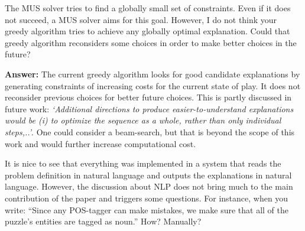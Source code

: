 \documentclass{article}
\newcommand\comment[1]{\marginpar{\tiny #1}}
\renewcommand\comment[1]{#1}
\newcommand{\tias}[1]{{\comment{\color{blue}\textsc{TG:}#1}}}
\newcommand{\emilio}[1]{{\comment{\color{red} \textsc{EG:}#1}}}
\newcommand{\answer}[1]{{\comment{\textbf{Answer:} #1}}}
\begin{document}

\begin{quoteit}
The MUS solver tries to find a globally small set of constraints. Even if it does not succeed, a MUS solver aims for this goal. However, I do not think your greedy algorithm tries to achieve any globally optimal explanation.
Could that greedy algorithm reconsiders some choices in order to make better choices in the future?
\end{quoteit}

\answer{The current greedy algorithm looks for good candidate explanations by generating constraints of increasing costs for the current state of play. It does not reconsider previous choices for better future choices. This is partly discussed in future work: \emph{`Additional directions to produce easier-to-understand explanations would be \emph{(i)} to  optimize the sequence as a whole, rather than only individual steps,..'}. One could consider a beam-search, but that is beyond the scope of this work and would further increase computational cost.}

\begin{quoteit}
It is nice to see that everything was implemented in a system that reads the problem definition in natural language and outputs the explanations in natural language. However, the discussion about NLP does not bring much to the main contribution of the paper and triggers some questions.
For instance, when you write: ``Since any POS-tagger can make mistakes, we make sure that all of the puzzle's entities are tagged as noun.'' How? Manually?
\end{quoteit}
\end{document}
